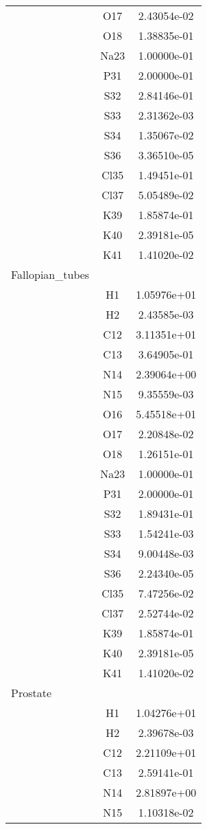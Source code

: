 \begin{centering}
\begin{longtable}{l c c}
& O17 & 2.43054e-02 \\ 
& O18 & 1.38835e-01 \\ 
& Na23 & 1.00000e-01 \\ 
& P31 & 2.00000e-01 \\ 
& S32 & 2.84146e-01 \\ 
& S33 & 2.31362e-03 \\ 
& S34 & 1.35067e-02 \\ 
& S36 & 3.36510e-05 \\ 
& Cl35 & 1.49451e-01 \\ 
& Cl37 & 5.05489e-02 \\ 
& K39 & 1.85874e-01 \\ 
& K40 & 2.39181e-05 \\ 
& K41 & 1.41020e-02 \\ 
\hline
Fallopian_tubes & & \\
\hline
& H1 & 1.05976e+01 \\ 
& H2 & 2.43585e-03 \\ 
& C12 & 3.11351e+01 \\ 
& C13 & 3.64905e-01 \\ 
& N14 & 2.39064e+00 \\ 
& N15 & 9.35559e-03 \\ 
& O16 & 5.45518e+01 \\ 
& O17 & 2.20848e-02 \\ 
& O18 & 1.26151e-01 \\ 
& Na23 & 1.00000e-01 \\ 
& P31 & 2.00000e-01 \\ 
& S32 & 1.89431e-01 \\ 
& S33 & 1.54241e-03 \\ 
& S34 & 9.00448e-03 \\ 
& S36 & 2.24340e-05 \\ 
& Cl35 & 7.47256e-02 \\ 
& Cl37 & 2.52744e-02 \\ 
& K39 & 1.85874e-01 \\ 
& K40 & 2.39181e-05 \\ 
& K41 & 1.41020e-02 \\ 
\hline
Prostate & & \\
\hline
& H1 & 1.04276e+01 \\ 
& H2 & 2.39678e-03 \\ 
& C12 & 2.21109e+01 \\ 
& C13 & 2.59141e-01 \\ 
& N14 & 2.81897e+00 \\ 
& N15 & 1.10318e-02 \\ 

\end{longtable}
\end{centering}
